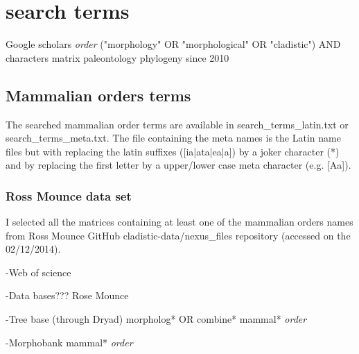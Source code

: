 \documentclass[a4paper,11pt]{article}
\begin{document}
\section{search terms}

Google scholars
\textit{order} ("morphology" OR "morphological" OR "cladistic") AND characters matrix paleontology phylogeny
since 2010

\subsection{Mammalian orders terms}
The searched mammalian order terms are available in search_terms_latin.txt or search_terms_meta.txt. The file containing the meta names is the Latin name files but with replacing the latin suffixes ([ia|ata|ea|a]) by a joker character (*) and by replacing the first letter by a upper/lower case meta character (e.g. [Aa]).

\subsubsection{Ross Mounce data set}
I selected all the matrices containing at least one of the mammalian orders names from Ross Mounce GitHub cladistic-data/nexus_files repository (accessed on the 02/12/2014).


-Web of science


-Data bases???
Rose Mounce

-Tree base (through Dryad)
morpholog* OR combine*
mammal*
\textit{order}


-Morphobank
mammal*
\textit{order}


\end{document}

